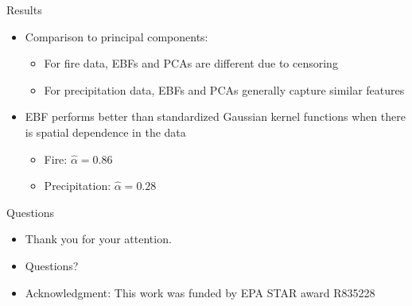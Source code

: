 \documentclass{beamer}
\begin{document}
\begin{frame}{Results}
	\begin{itemize} \setlength{\itemsep}{1em}
    \item Comparison to principal components: \vspace{0.5em}
    \begin{itemize} \setlength{\itemsep}{0.5em}
		  \item For fire data, EBFs and PCAs are different due to censoring
		  \item For precipitation data, EBFs and PCAs generally capture similar features
    \end{itemize}
		\item EBF performs better than standardized Gaussian kernel functions when there is spatial dependence in the data \vspace{0.5em}
    \begin{itemize} \setlength{\itemsep}{0.5em}
      \item Fire: $\hat{\alpha} = 0.86$
      \item Precipitation: $\hat{\alpha} = 0.28$
    \end{itemize}
	\end{itemize}
\end{frame}

%


\begin{frame}{Questions}
	\begin{itemize} \setlength{\itemsep}{1em}
		\item Thank you for your attention.
    \item Questions?
		\item Acknowledgment: This work was funded by EPA STAR award R835228
	\end{itemize}
\end{frame}
\end{document}
